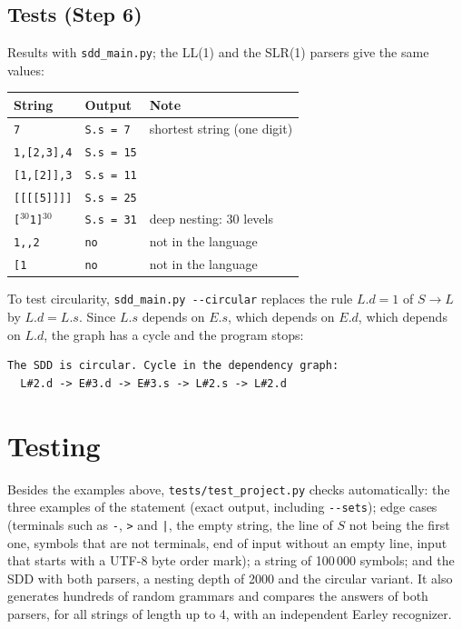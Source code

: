 \documentclass[11pt]{article}
\begin{document}
\subsection{Tests (Step 6)}

Results with \texttt{sdd\_main.py}; the LL(1) and the SLR(1) parsers give
the same values:

\begin{center}\small
\begin{tabular}{lll}
\toprule
String & Output & Note \\
\midrule
\texttt{7} & \texttt{S.s = 7} & shortest string (one digit) \\
\texttt{1,{}[2,{}3],{}4} & \texttt{S.s = 15} &  \\
\texttt{[1,{}[2]],{}3} & \texttt{S.s = 11} &  \\
\texttt{[[[[5]]]]} & \texttt{S.s = 25} &  \\
\texttt{[}$^{30}$\texttt{1}\texttt{]}$^{30}$ & \texttt{S.s = 31} & deep nesting: 30 levels \\
\texttt{1,{},{}2} & \texttt{no} & not in the language \\
\texttt{[1} & \texttt{no} & not in the language \\
\bottomrule
\end{tabular}
\end{center}

\noindent To test circularity, \texttt{sdd\_main.py -{}-circular} replaces the
rule $L.d = 1$ of $S \to L$ by $L.d = L.s$. Since $L.s$ depends on $E.s$,
which depends on $E.d$, which depends on $L.d$, the graph has a cycle and the
program stops:

{\small
\begin{verbatim}
The SDD is circular. Cycle in the dependency graph:
  L#2.d -> E#3.d -> E#3.s -> L#2.s -> L#2.d
\end{verbatim}}

\section{Testing}

Besides the examples above, \texttt{tests/test\_project.py} checks
automatically: the three examples of the statement (exact output, including
\texttt{-{}-sets}); edge cases (terminals such as \texttt{-}, \texttt{\textgreater} and
\texttt{|}, the empty string, the line of $S$ not being the first one,
symbols that are not terminals, end of input without an empty line, input that
starts with a UTF-8 byte order mark); a string
of 100\,000 symbols; and the SDD with both parsers, a nesting depth of 2000
and the circular variant. It also generates hundreds of random grammars and
compares the answers of both parsers, for all strings of length up to 4, with
an independent Earley recognizer.
\end{document}
